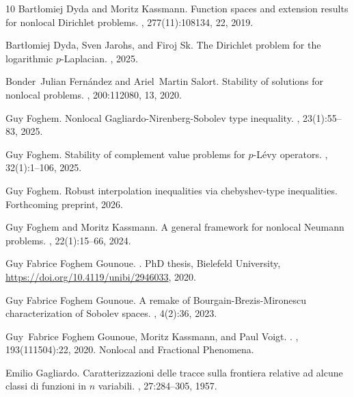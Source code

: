 \documentclass[12pt, reqno]{amsart}%
\theoremstyle{plain}  %
\theoremstyle{definition}  %
\numberwithin{equation}{section}
\begin{document}
{\begin{thebibliography}{10}
Bart{\l}omiej Dyda and Moritz Kassmann.
\newblock Function spaces and extension results for nonlocal {D}irichlet
  problems.
, 277(11):108134, 22, 2019.

Bartłomiej Dyda, Sven Jarohs, and Firoj Sk.
\newblock The {D}irichlet problem for the logarithmic {$p$-Laplacian}.
, 2025.

Bonder~Julian Fern\'{a}ndez and Ariel~Martin Salort.
\newblock Stability of solutions for nonlocal problems.
, 200:112080, 13, 2020.

Guy Foghem.
\newblock Nonlocal {G}agliardo-{N}irenberg-{S}obolev type inequality.
, 23(1):55--83, 2025.

Guy Foghem.
\newblock Stability of complement value problems for {$p$}-{L}\'evy operators.
, 32(1):1--106, 2025.

Guy Foghem.
\newblock Robust interpolation inequalities via chebyshev-type inequalities.
\newblock Forthcoming preprint, 2026.

Guy Foghem and Moritz Kassmann.
\newblock A general framework for nonlocal {N}eumann problems.
, 22(1):15--66, 2024.

{Guy Fabrice} {Foghem Gounoue}.
.
\newblock PhD thesis, Bielefeld University,
  \url{https://doi.org/10.4119/unibi/2946033}, 2020.

{Guy Fabrice} {Foghem Gounoue}.
\newblock A remake of {B}ourgain-{B}rezis-{M}ironescu characterization of
  {S}obolev spaces.
, 4(2):36, 2023.

Guy~Fabrice {Foghem Gounoue}, Moritz {Kassmann}, and Paul {Voigt}.
.
, 193(111504):22, 2020.
\newblock Nonlocal and Fractional Phenomena.

Emilio Gagliardo.
\newblock Caratterizzazioni delle tracce sulla frontiera relative ad alcune
  classi di funzioni in {$n$} variabili.
, 27:284--305, 1957.


\end{thebibliography}}
\end{document}
